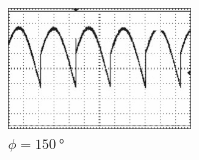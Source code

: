 	\hfill
	\begin{subfigure}{0.3\textwidth}
		\centering
		\includegraphics[height=3.21cm]{content/no_noise/150_no_noise.png}
		\caption{$\phi = \qty{150}{\degree}$}
	\end{subfigure}
